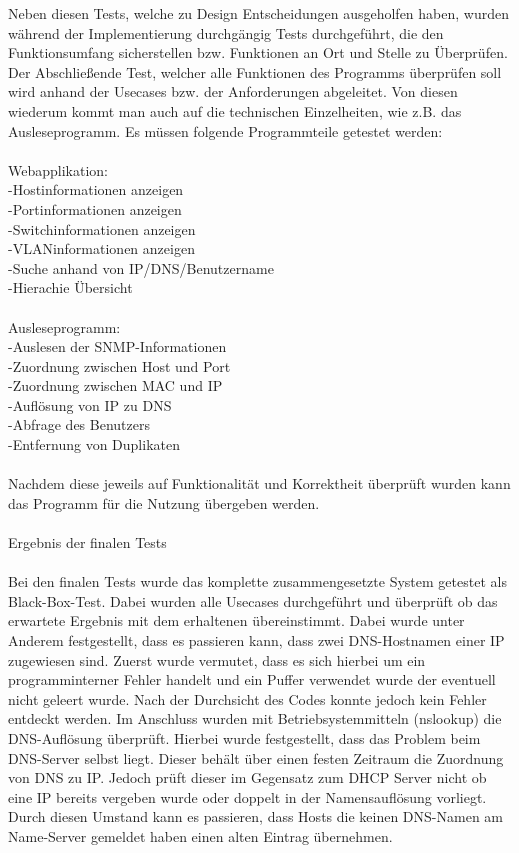Neben diesen Tests, welche zu Design Entscheidungen ausgeholfen haben, wurden während der Implementierung durchgängig Tests durchgeführt, die den Funktionsumfang sicherstellen bzw. Funktionen an Ort und Stelle zu Überprüfen.\\
Der Abschließende Test, welcher alle Funktionen des Programms überprüfen soll wird anhand der Usecases bzw. der Anforderungen abgeleitet. Von diesen wiederum kommt man auch auf die technischen Einzelheiten, wie z.B. das Ausleseprogramm.
Es müssen folgende Programmteile getestet werden:\\
\\
Webapplikation:\\
-Hostinformationen anzeigen\\
-Portinformationen anzeigen\\
-Switchinformationen anzeigen\\
-VLANinformationen anzeigen\\
-Suche anhand von IP/DNS/Benutzername\\
-Hierachie Übersicht\\
\\
Ausleseprogramm:\\
-Auslesen der SNMP-Informationen\\
-Zuordnung zwischen Host und Port \\
-Zuordnung zwischen MAC und IP\\
-Auflösung von IP zu DNS\\
-Abfrage des Benutzers\\
-Entfernung von Duplikaten\\
\\
Nachdem diese jeweils auf Funktionalität und Korrektheit überprüft wurden kann das Programm für die Nutzung übergeben werden.\\
\\
Ergebnis der finalen Tests\\
\\
Bei den finalen Tests wurde das komplette zusammengesetzte System getestet als Black-Box-Test. Dabei wurden alle Usecases durchgeführt und überprüft ob das erwartete Ergebnis mit dem erhaltenen übereinstimmt. Dabei wurde unter Anderem festgestellt, dass es passieren kann, dass zwei DNS-Hostnamen einer IP zugewiesen sind. Zuerst wurde vermutet, dass es sich hierbei um ein programminterner Fehler handelt und ein Puffer verwendet wurde der eventuell nicht geleert wurde. Nach der Durchsicht des Codes konnte jedoch kein Fehler entdeckt werden. Im Anschluss wurden mit Betriebsystemmitteln (nslookup) die DNS-Auflösung überprüft. Hierbei wurde festgestellt, dass das Problem beim DNS-Server selbst liegt. Dieser behält über einen festen Zeitraum die Zuordnung von DNS zu IP. Jedoch prüft dieser im Gegensatz zum DHCP Server nicht ob eine IP bereits vergeben wurde oder doppelt in der Namensauflösung vorliegt. Durch diesen Umstand kann es passieren, dass Hosts die keinen DNS-Namen am Name-Server gemeldet haben einen alten Eintrag übernehmen.


